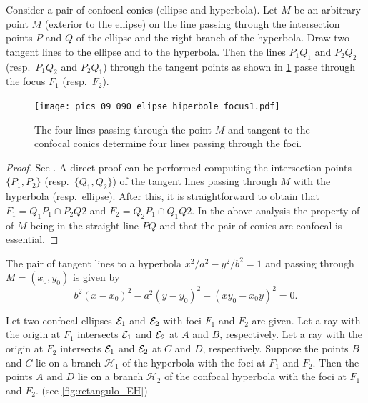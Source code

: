 \begin{theorem}\label{th:ehfocus}
Consider a pair of confocal conics (ellipse and hyperbola). Let $M$ be  an arbitrary point $M$ (exterior to the ellipse)
on the line passing through the intersection points $P$ and $Q$ of the ellipse and the right branch of
the hyperbola. Draw two tangent lines to the ellipse and to the hyperbola. Then the   lines $P_1Q_1$ and $P_2Q_2$ (resp.\ $P_1Q_2$ and $P_2Q_1$)
through the tangent points as shown in \cref{fig:ehfocus}  passe  through the focus $F_1$ (resp.\   $F_2$). 
\end{theorem}


\begin{figure}
	\begin{center}
 	 \texttt{[image: pics\_09\_090\_elipse\_hiperbole\_focus1.pdf]}
		\caption{The four lines passing through the point $M$ and tangent to the confocal conics determine four lines passing through the foci. \label{fig:ehfocus}}
	\end{center}
\end{figure}
\begin{proof}
See \cite{dolgirev2014}. A direct proof can be performed computing the intersection points $\{P_1,P_2\}$ (resp.\ $\{Q_1,Q_2\}$) of the tangent lines passing through $M$ with the hyperbola (resp.\ ellipse). After this, it is straightforward to obtain that $F_1= Q_1P_1\cap P_2Q2$
and $F_2= Q_2P_1\cap Q_1Q2$. 
In the above analysis the property of of $M$ being in the straight line $PQ$ and that the pair of conics are confocal is essential.
\end{proof}
\begin{remark}
The pair of tangent lines to a hyperbola $x^2/a^2-y^2/b^2=1$ and passing through $M=(x_0,y_0)$ is given by
\[ b^2(x - x_0)^2 -a^2(y - y_0)^2  + (xy_0 - x_0y)^2=0.
\]
\end{remark}

 \begin{theorem}\label{th:dolgirev}
 Let two confocal ellipses $\mathcal{E}_1$ and $\mathcal{E}_2$   with foci $F_1 $ and $F_2$ are given. Let a
 ray with the origin at $F_1$ intersects $\mathcal{E}_1$ and $\mathcal{E}_2$ at $A$ and $B$, respectively. Let a ray with
 the origin at $F_2$ intersects $\mathcal{E}_1$ and $\mathcal{E}_2$ at $C$ and $D$, respectively. Suppose the points $B$ and
 $C$ lie on a branch $\mathcal{H}_1$   of the hyperbola with the foci at $F_1$ and $F_2$.
 Then the points $A$
 and $D$ lie on a branch $\mathcal{H}_2$ of the confocal hyperbola with the foci at $F_1$ and $F_2$. (see \cref{fig:retangulo_EH})

 \end{theorem}

